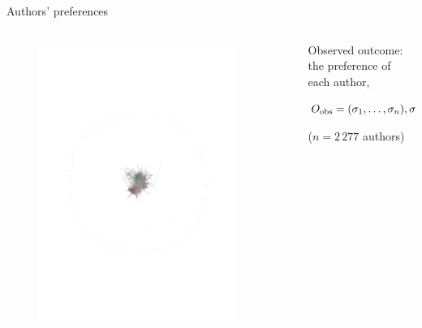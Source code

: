 \documentclass[10pt]{beamer}
\begin{document}
\begin{frame}{Authors' preferences}
\begin{columns}
    \begin{column}{0.65\textwidth}
        \vspace{-1em}
        \begin{figure}[!h]
        \centering\includegraphics[width=0.9\textwidth,trim=250 350 225 350,clip]{authors_network.pdf}
        \end{figure}
    \end{column}
    \begin{column}{0.35\textwidth}
        \centering
        Observed outcome: the preference of each author,

        \vspace{1em}
        
        $O_{\text{obs}}=(\sigma_1,\dots,\sigma_n), \sigma \in \{\textcolor[HTML]{EE7993}{-1},\textcolor[HTML]{3FB17D}{+1}\}$

        \vspace{1em}

        ($n=2\,277$ authors)
    \end{column}
\end{columns}
\end{frame}
\end{document}
